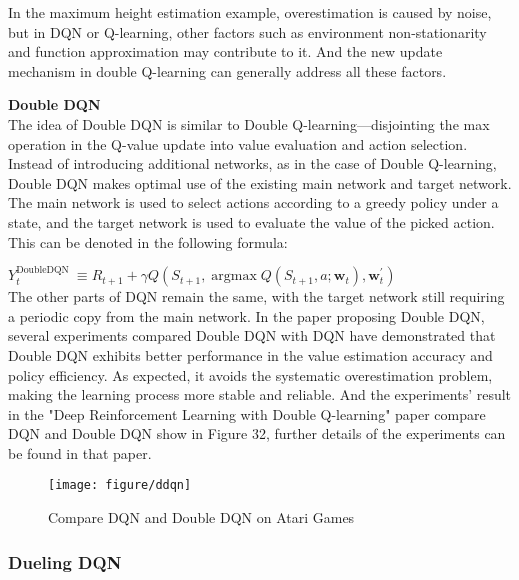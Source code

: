 \documentclass{article}
\begin{document}
In the  maximum height estimation example, overestimation is caused by noise, but in DQN or Q-learning, other factors such as environment non-stationarity and function approximation may contribute to it. And the new update mechanism in double Q-learning can generally address all these factors.


\hspace*{\fill}

\noindent
\textbf{Double DQN}\\
\noindent
The idea of Double DQN is similar to Double Q-learning—disjointing the max operation in the Q-value update into value evaluation and action selection. Instead of introducing additional networks, as in the case of Double Q-learning, Double DQN makes optimal use of the existing main network and target network. The main network is used to select actions according to a greedy policy under a state, and the target network is used to evaluate the value of the picked action. This can be denoted in the following formula:

\hspace*{\fill}

$Y_t^{\text {DoubleDQN }} \equiv R_{t+1}+\gamma Q\left(S_{t+1}, \operatorname{argmax} Q\left(S_{t+1}, a ; \boldsymbol{w}_t\right), \boldsymbol{w}_t^{'}\right)$\\

The other parts of DQN remain the same, with the target network still requiring a periodic copy from the main network. In the paper proposing Double DQN, several experiments compared Double DQN with DQN have demonstrated that Double DQN exhibits better performance in the value estimation accuracy and policy efficiency. As expected, it avoids the systematic overestimation problem, making the learning process more stable and reliable. And the experiments' result in the "Deep Reinforcement Learning with Double Q-learning" paper compare DQN and Double DQN show in Figure 32, further details of the experiments can be found in that paper.

\begin{figure}[htbp]
        \centering
        \texttt{[image: figure/ddqn]}
        \caption{Compare DQN and Double DQN on Atari Games}
     \end{figure}

\newpage
\subsubsection{Dueling DQN}
\end{document}
